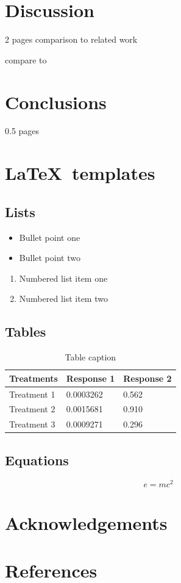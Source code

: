 \documentclass[review]{elsarticle}
\begin{document}
\section{Discussion}
2 pages comparison to related work

compare to \cite{Rysanek2013324}

\section{Conclusions}
0.5 pages

\section{\LaTeX\ templates}


\subsection{Lists}
\begin{itemize}
\item Bullet point one
\item Bullet point two
\end{itemize}

\begin{enumerate}
\item Numbered list item one
\item Numbered list item two
\end{enumerate}

\subsection{Tables}
\begin{table}[h]
\centering
\begin{tabular}{l l l}
\hline
\textbf{Treatments} & \textbf{Response 1} & \textbf{Response 2}\\
\hline
Treatment 1 & 0.0003262 & 0.562 \\
Treatment 2 & 0.0015681 & 0.910 \\
Treatment 3 & 0.0009271 & 0.296 \\
\hline
\end{tabular}
\caption{Table caption}
\end{table}



\subsection{Equations}
\begin{equation}
\label{eq:emc}
e = mc^2
\end{equation}

\section*{Acknowledgements}

\section*{References}

\end{document}
